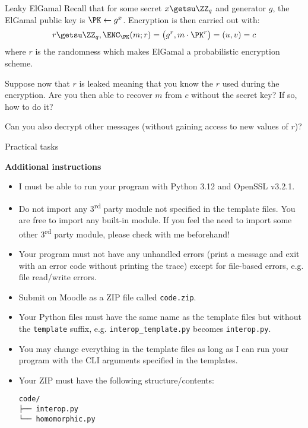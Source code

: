 \documentclass{homework}
\begin{document}
\begin{task}{Leaky ElGamal}
  Recall that for some secret $x\getsu\ZZ_q$ and generator $g$, the ElGamal public key is $\PK\gets g^x$.
  Encryption is then carried out with:
  \[
    r \getsu \ZZ_q, \ENC_\PK(m; r) = \bigl(g^r, m \cdot \PK^r\bigr) = (u, v) = c
  \]
  where $r$ is the randomness which makes ElGamal a probabilistic encryption scheme.

  Suppose now that $r$ is leaked meaning that you know the $r$ used during the encryption.
  Are you then able to recover $m$ from $c$ without the secret key?
  If so, how to do it?

  Can you also decrypt other messages (without gaining access to new values of $r$)?
\end{task}

\newpage
\setcounter{task}{0}

\begin{center}
  Practical tasks
\end{center}

\textbf{Additional instructions}

\begin{itemize}
  \item I must be able to run your program with Python 3.12 and OpenSSL v3.2.1\footnotemark{}.
  \item Do not import any 3\textsuperscript{rd} party module\footnotemark{} not specified in the template files.
  You are free to import any built-in module.
  If you feel the need to import some other 3\textsuperscript{rd} party module, please check with me beforehand!
  \item Your program must not have any unhandled errors (print a message and exit with an error code without printing the trace) except for file-based errors, e.g. file read/write errors.
  \item Submit on Moodle as a ZIP file called \texttt{code.zip}.
  \item Your Python files must have the same name as the template files but without the \texttt{template} suffix, e.g. \texttt{interop\_template.py} becomes \texttt{interop.py}.
  \item You may change everything in the template files as long as I can run your program with the CLI arguments specified in the templates.
  \item Your ZIP must have the following structure/contents:
  \begin{Verbatim}
code/
├── interop.py
└── homomorphic.py
  \end{Verbatim}
\begin{Verbatim}
  
\end{Verbatim}
\end{itemize}
\end{document}
